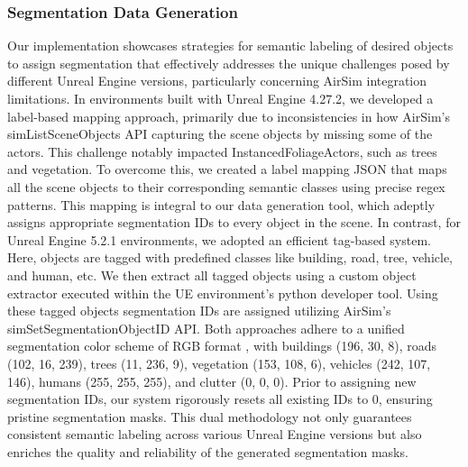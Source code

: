 \documentclass[../report.tex]{subfiles}
\begin{document}
     \subsubsection{Segmentation Data Generation}
     Our implementation showcases strategies for semantic labeling of desired objects to assign segmentation that effectively addresses the unique challenges posed by different Unreal Engine versions, particularly concerning AirSim integration limitations. In environments built with Unreal Engine 4.27.2, we developed a label-based mapping approach, primarily due to inconsistencies in how AirSim's simListSceneObjects API capturing the scene objects by missing some of the actors. This challenge notably impacted InstancedFoliageActors, such as trees and vegetation. To overcome this, we created a label mapping JSON that maps all the scene objects to their corresponding semantic classes using precise regex patterns. This mapping is integral to our data generation tool, which adeptly assigns appropriate segmentation IDs to every object in the scene. In contrast, for Unreal Engine 5.2.1 environments, we adopted an efficient tag-based system. Here, objects are tagged with predefined classes like building, road, tree, vehicle, and human, etc. We then extract all tagged objects using a custom object extractor executed within the UE environment's python developer tool. Using these tagged objects segmentation IDs are assigned utilizing AirSim's simSetSegmentationObjectID API. Both approaches adhere to a unified segmentation color scheme of RGB format \cite{airsimsegrgbtxt}, with buildings (196, 30, 8), roads (102, 16, 239), trees (11, 236, 9), vegetation (153, 108, 6), vehicles (242, 107, 146), humans (255, 255, 255), and clutter (0, 0, 0). Prior to assigning new segmentation IDs, our system rigorously resets all existing IDs to 0, ensuring pristine segmentation masks. This dual methodology not only guarantees consistent semantic labeling across various Unreal Engine versions but also enriches the quality and reliability of the generated segmentation masks. 
\end{document}
